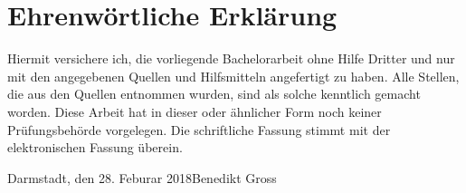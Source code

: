 	\chapter*{Ehrenw\"ortliche Erkl\"arung}
	Hiermit versichere ich, die vorliegende Bachelorarbeit ohne Hilfe Dritter und nur mit den angegebenen Quellen
    und Hilfsmitteln angefertigt zu haben. Alle Stellen, die aus den Quellen entnommen wurden, sind als solche
    kenntlich gemacht worden. Diese Arbeit hat in dieser oder \"ahnlicher Form noch keiner Pr\"ufungsbeh\"orde vorgelegen.
    Die schriftliche Fassung stimmt mit der elektronischen Fassung \"uberein.
	\vspace{1.5cm}
	
	\noindent Darmstadt, den 28. Feburar 2018\hfill Benedikt Gross